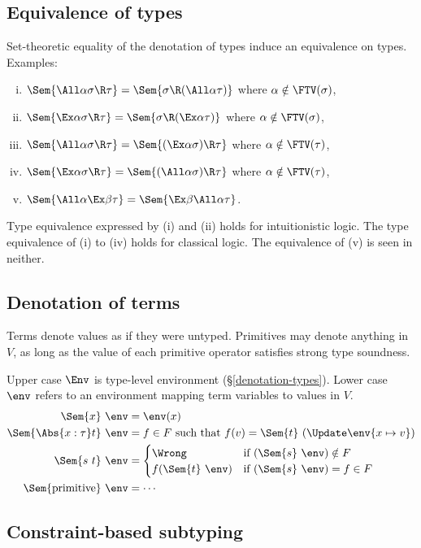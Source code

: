 \documentclass{amsart}
\theoremstyle{definition}
\begin{document}
\subsection{Equivalence of types}
Set-theoretic equality of the denotation of types induce an
equivalence on types. Examples:
\begin{enumerate}[(i)]
\item
$\Sem{\All\alpha\sigma\R\tau}=\Sem{\sigma\R(\All\alpha\tau)}$
where $\alpha\notin\FTV(\sigma)$,
\item
$\Sem{\Ex\alpha\sigma\R\tau}=\Sem{\sigma\R(\Ex\alpha\tau)}$
where $\alpha\notin\FTV(\sigma)$,
\item
$\Sem{\All\alpha\sigma\R\tau}=\Sem{(\Ex\alpha\sigma)\R\tau}$
where $\alpha\notin\FTV(\tau)$,
\item
$\Sem{\Ex\alpha\sigma\R\tau}=\Sem{(\All\alpha\sigma)\R\tau}$
where $\alpha\notin\FTV(\tau)$,
\item
$\Sem{\All\alpha\Ex\beta\tau}=\Sem{\Ex\beta\All\alpha\tau}$.
\end{enumerate}
Type equivalence expressed by (i) and (ii) holds for
intuitionistic logic. The type equivalence of (i) to (iv) holds
for classical logic. The equivalence of (v) is seen in neither.


\subsection{Denotation of terms}
\label{denotation-terms}
Terms denote values as if they were untyped. Primitives may
denote anything in $V$, as long as the value of each primitive
operator satisfies strong type soundness.

Upper case $\Env$ is type-level environment
(\S\ref{denotation-types}). Lower case $\env$ refers to an
environment mapping term variables to values in $V$.
\begin{align*}
\Sem{x}~\env&=\env(x)\\
\Sem{\Abs{x:\tau}t}~\env&=
  f\in F\text{ such that }
  f(v)=\Sem{t}~(\Update\env{x\mapsto v})
\\
\Sem{s~t}~\env&=
\begin{cases}
\Wrong&\text{if }(\Sem{s}~\env)\notin F\\
f(\Sem{t}~\env)&\text{if }(\Sem{s}~\env)=f\in F
\end{cases}
\\
\Sem{\mathrm{primitive}}~\env&=\cdots
\end{align*}


\subsection{Constraint-based subtyping}
\end{document}
